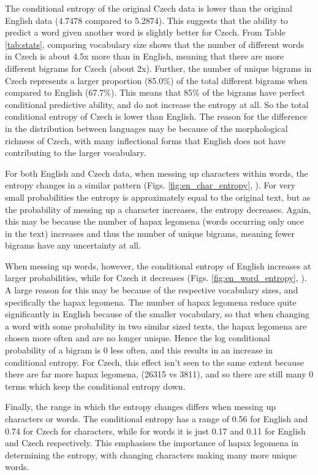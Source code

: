 \documentclass[a4paper]{article}
\begin{document}
The conditional entropy of the original Czech data is lower than the original
English data (4.7478 compared to 5.2874). This suggests that the ability to
predict a word given another word is slightly better for Czech. From Table
\ref{tab:stats}, comparing vocabulary size shows that the number of different
words in Czech is about 4.5x more than in English, meaning that there are more
different bigrams for Czech (about 2x). Further, the number of unique bigrams
in Czech represents a larger proportion (85.0\%) of the total different bigrams
when compared to English (67.7\%). This means that 85\% of the bigrams have
perfect conditional predictive ability, and do not increase the entropy at all.
So the total conditional entropy of Czech is lower than English. The reason for
the difference in the distribution between languages may be because of the
morphological richness of Czech, with many inflectional forms that English does
not have contributing to the larger vocabulary.

For both English and Czech data, when messing up characters within words, the
entropy changes in a similar pattern (Figs. \ref{fig:en_char_entropy},
). For very small probabilities the entropy is
approximately equal to the original text, but as the probability of messing up a
character increases, the entropy decreases. Again, this may be because the
number of hapax legomena (words occurring only once in the text) increases and
thus the number of unique bigrams, meaning fewer bigrams have any uncertainty at
all.

When messing up words, however, the conditional entropy of English increases
at larger probabilities, while for Czech it decreases (Figs.
\ref{fig:en_word_entropy}, ). A large reason for
this may be because of the respective vocabulary sizes, and specifically the
hapax legomena. The number of hapax legomena reduce quite significantly in
English because of the smaller vocabulary, so that when changing a word with
some probability in two similar sized texts, the hapax legomena are chosen more
often and are no longer unique. Hence the log conditional probability of a
bigram is 0 less often, and this results in an increase in conditional entropy.
For Czech, this effect isn't seen to the same extent because there are far more
hapax legomena, (26315 vs 3811), and so there are still many 0 terms which keep
the conditional entropy down.

Finally, the range in which the entropy changes differs when messing up
characters or words. The conditional entropy has a range of 0.56 for English and
0.74 for Czech for characters, while for words it is just 0.17 and 0.11 for
English and Czech respectively. This emphasises the importance of hapax legomena
in determining the entropy, with changing characters making many more unique
words.
\end{document}
